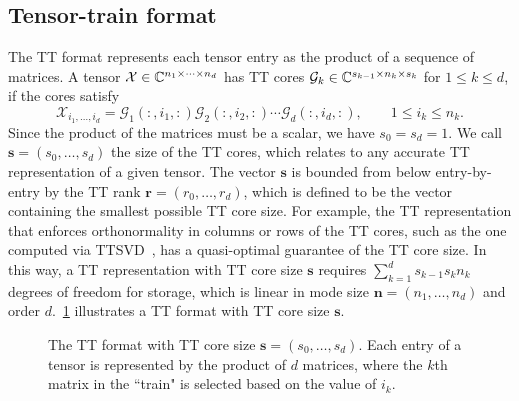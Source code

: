 \documentclass[11pt,a4paper,review]{siamart220329}
\begin{document}
\subsection{Tensor-train format} \label{sec:TT}
The TT format represents each tensor entry as the product of a sequence of matrices. A tensor $\mathcal{X}\in\mathbb{C}^{n_1\times \cdots \times n_d}$ has TT cores $\mathcal{G}_k \in \mathbb{C}^{s_{k-1} \times n_k \times s_k}$ for $1 \le k \le d$, if the cores satisfy
\[
\mathcal{X}_{i_1,\ldots,i_d} = \mathcal{G}_1(:,i_1,:)\mathcal{G}_2(:,i_2,:) \cdots \mathcal{G}_d(:,i_d,:), \qquad 1\leq i_k \leq n_k.
\]
Since the product of the matrices must be a scalar, we have $s_0 = s_d = 1$. We call $\pmb{s} = (s_0,\ldots,s_d)$ the size of the TT cores, which relates to any accurate TT representation of a given tensor. The vector $\pmb{s}$ is bounded from below entry-by-entry by the TT rank $\pmb{r}= (r_0,\ldots,r_d)$, which is defined to be the vector containing the smallest possible TT core size. For example, the TT representation that enforces orthonormality in columns or rows of the TT cores, such as the one computed via TTSVD~\cite{oseledets2011tensor}, has a quasi-optimal guarantee of the TT core size. In this way, a TT representation with TT core size $\pmb{s}$ requires $\sum_{k=1}^d s_{k-1}s_k n_k$ degrees of freedom for storage, which is linear in mode size $\pmb{n}=(n_1,\ldots,n_d)$ and order $d$.~\cref{fig:TT} illustrates a TT format with TT core size $\pmb{s}$.
\begin{figure}
\centering
{}
\caption{The TT format with TT core size $\pmb{s} = (s_0,\ldots,s_d)$. Each entry of a tensor is represented by the product of $d$ matrices, where the $k$th matrix in the ``train" is selected based on the value of $i_k$.}
\label{fig:TT}
\end{figure}
\end{document}
